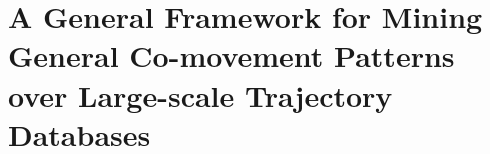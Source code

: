 \chapter{A General Framework for Mining General Co-movement Patterns over Large-scale Trajectory Databases}







